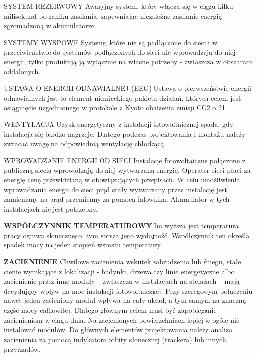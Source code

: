 \documentclass[12pt,a4paper]{article}
\begin{document}
SYSTEM REZERWOWY
Awaryjny system, który włącza się w ciągu kilku milisekund po zaniku zasilania, zapewniając niezależne zasilanie energią zgromadzoną w akumulatorze.


SYSTEMY WYSPOWE
Systemy, które nie są podłączone do sieci i w przeciwieństwie do systemów podłączonych do sieci nie wprowadzają do niej energii, tylko produkują ją wyłącznie na własne potrzeby - zwłaszcza w obszarach oddalonych.


USTAWA O ENERGII ODNAWIALNEJ (EEG)
Ustawa o pierwszeństwie energii odnawialnych jest to element niemieckiego pakietu działań, których celem jest osiągnięcie uzgodnionego w protokole z Kyoto obniżenia emisji CO2 o 21%


WENTYLACJA
Uzysk energetyczny z instalacji fotowoltaicznej spada, gdy instalacja się bardzo nagrzeje. Dlatego podczas projektowania i montażu należy zwracać uwagę na odpowiednią wentylację chłodzącą.


WPROWADZANIE ENERGII OD SIECI
Instalacje fotowoltaiczne połączone z publiczną siecią wprowadzają do niej wytwarzaną energię. Operator sieci płaci za energię cenę przewidzianą w obowiązujących przepisach. W celu umożliwienia wprowadzania energii do sieci prąd stały wytwarzany przez instalację jest zamieniany na prąd przemienny za pomocą falownika. Akumulator w tych instalacjach nie jest potrzebny.


\textbf{WSPÓŁCZYNNIK TEMPERATUROWY}
Im wyższa jest temperatura pracy ogniwa słonecznego, tym gorsza jego wydajność. Współczynnik ten określa spadek mocy na jeden stopień wzrostu temperatury.


\textbf{ZACIENIENIE}
Chwilowe zacienienia wskutek zabrudzenia lub śniegu, stałe cienie wynikające z lokalizacji - budynki, drzewa czy linie energetyczne albo zacienienie przez inne moduły – zwłaszcza w instalacjach na stelażach – mają decydujący wpływ na moc instalacji fotowoltaicznej. Przy szeregowym połączeniu nawet jeden zacieniony moduł wpływa na cały układ, a tym samym na znaczną część mocy całkowitej. Dlatego głównym celem musi być zapobieganie zacienieniom w ciągu dnia. Na zacienionych powierzchniach lepiej w ogóle nie instalować modułów. Do głównych elementów projektowania należy analiza zacienienia za pomocą indykatora orbity słonecznej (trackera) lub innych przyrządów.
\end{document}

